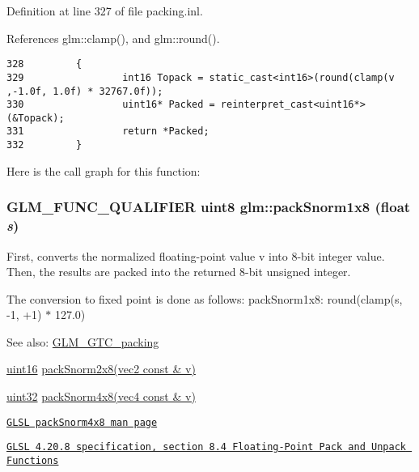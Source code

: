 Definition at line 327 of file packing.inl.

References glm::clamp(), and glm::round().

\begin{Code}\begin{verbatim}328         {
329                 int16 Topack = static_cast<int16>(round(clamp(v ,-1.0f, 1.0f) * 32767.0f));
330                 uint16* Packed = reinterpret_cast<uint16*>(&Topack);
331                 return *Packed;
332         }
\end{verbatim}
\end{Code}




Here is the call graph for this function:\hypertarget{group__gtc__packing_g26b6cd7a35c46c4b6a342f3b97b47423}{
\subsubsection[packSnorm1x8]{\setlength{\rightskip}{0pt plus 5cm}GLM\_\-FUNC\_\-QUALIFIER uint8 glm::packSnorm1x8 (float {\em s})}}
\label{group__gtc__packing_g26b6cd7a35c46c4b6a342f3b97b47423}


First, converts the normalized floating-point value v into 8-bit integer value. Then, the results are packed into the returned 8-bit unsigned integer.

The conversion to fixed point is done as follows: packSnorm1x8: round(clamp(s, -1, +1) $\ast$ 127.0)

\begin{Desc}
\item[See also:]\hyperlink{group__gtc__packing}{GLM\_\-GTC\_\-packing} 

\hyperlink{group__gtc__type__precision_gd8c2939e1fdd8e5828b31d95c52255d5}{uint16} \hyperlink{group__gtc__packing_g05d08a82923166ec7cd5d0e6154c9953}{packSnorm2x8(vec2 const \& v)} 

\hyperlink{group__gtc__type__precision_g202b6a53c105fcb7e531f9b443518451}{uint32} \hyperlink{group__core__func__packing_gfcf25acc0d361c6c696a433aa5dfd16b}{packSnorm4x8(vec4 const \& v)} 

\href{http://www.opengl.org/sdk/docs/manglsl/xhtml/packSnorm4x8.xml}{\tt GLSL packSnorm4x8 man page} 

\href{http://www.opengl.org/registry/doc/GLSLangSpec.4.20.8.pdf}{\tt GLSL 4.20.8 specification, section 8.4 Floating-Point Pack and Unpack Functions} \end{Desc}


